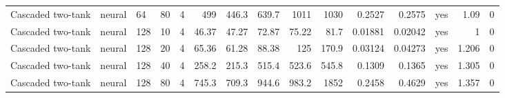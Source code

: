 \begin{table}
\begin{tabular}{lllrrrrrrrrrlrr}
Cascaded two-tank & neural & 64 & 80 & 4 & 499 & 446.3 & 639.7 & 1011 & 1030 & 0.2527 & 0.2575 & yes & 1.09 & 0 \\
Cascaded two-tank & neural & 128 & 10 & 4 & 46.37 & 47.27 & 72.87 & 75.22 & 81.7 & 0.01881 & 0.02042 & yes & 1 & 0 \\
Cascaded two-tank & neural & 128 & 20 & 4 & 65.36 & 61.28 & 88.38 & 125 & 170.9 & 0.03124 & 0.04273 & yes & 1.206 & 0 \\
Cascaded two-tank & neural & 128 & 40 & 4 & 258.2 & 215.3 & 515.4 & 523.6 & 545.8 & 0.1309 & 0.1365 & yes & 1.305 & 0 \\
Cascaded two-tank & neural & 128 & 80 & 4 & 745.3 & 709.3 & 944.6 & 983.2 & 1852 & 0.2458 & 0.4629 & yes & 1.357 & 0 \\
\bottomrule
\end{tabular}
\end{table}

